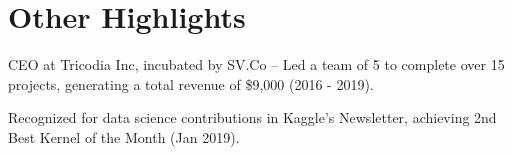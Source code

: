 \documentclass[]{sachin-resume-openfont}
\begin{document}
\begin{minipage}[t]{0.69\textwidth}
\section{Other Highlights}
\vspace{\topsep}  %
\begin{tightemize}
\item CEO at Tricodia Inc, incubated by SV.Co – Led a team of 5 to complete over 15 projects, generating a total revenue of \$9,000 (2016 - 2019).
\item Recognized for data science contributions in Kaggle’s Newsletter, achieving 2nd Best Kernel of the Month (Jan 2019).
\end{tightemize}
\sectionsep
\end{minipage} 
\end{document}
